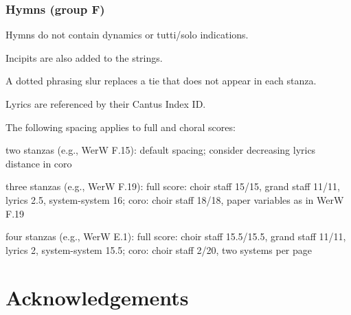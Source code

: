 \documentclass{ees}
\begin{document}
\subsubsection{Hymns (group F)}

Hymns do not contain dynamics or tutti/solo indications.

Incipits are also added to the strings.

A dotted phrasing slur replaces a tie that does not appear in each stanza.

Lyrics are referenced by their Cantus Index ID.

The following spacing applies to full and choral scores:
\begin{bulletlist}
  \item two stanzas (e.g., WerW F.15):
    default spacing;
    consider decreasing lyrics distance in coro
  \item three stanzas (e.g., WerW F.19):
    full score:
      choir staff 15/15,
      grand staff 11/11,
      lyrics 2.5,
      system-system 16;
    coro:
      choir staff 18/18,
      paper variables as in WerW F.19
  \item four stanzas (e.g., WerW E.1):
    full score:
      choir staff 15.5/15.5,
      grand staff 11/11,
      lyrics 2,
      system-system 15.5;
    coro:
      choir staff 2/20,
      two systems per page
\end{bulletlist}



\section{Acknowledgements}
\end{document}

